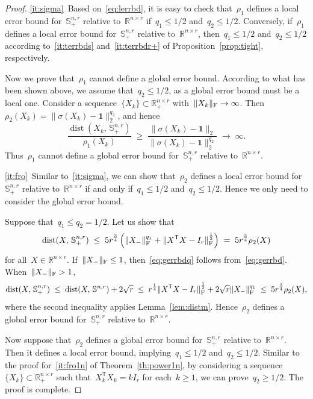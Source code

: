 \documentclass[11pt,a4paper]{article}  %
\theoremstyle{definition}
\DeclareMathOperator{\dist}{dist}
\newcommand{\RR}{\mathbb{R}}
\newcommand{\res}{\rho}
\newcommand{\col}{r}
\newcommand{\stf}[1]{\mathbb{S}^{#1}}
\newcommand{\fro}{{\scriptstyle{\textnormal{F}}}}
\newcommand{\trs}{{\scriptstyle{\mathsf{T}}}}
\newcommand{\ones}{\mathbf{1}}
\begin{document}
\begin{proof}
   \ref{it:sigma}~Based on~\eqref{eq:lerrbd}, it is easy to check that~$\res_1$ defines a local error bound
    for~$\stf{n,\col}_+$ relative to~$\RR^{n\times \col}$ if~$q_1 \le 1/2$ and~$q_2\le 1/2$.
    Conversely, if~$\res_1$ defines a local error bound for~$\stf{n,\col}_+$ relative
    to~$\RR^{n\times \col}$, then~$q_1 \le 1/2$ and~$q_2\le 1/2$ according to~\ref{it:terrbds}
    and~\ref{it:terrbdr+} of Proposition~\ref{prop:tight}, respectively.

    Now we prove that~$\res_1$ cannot define a global error bound.
    According to what has been shown above, we assume that~$q_2 \le 1/2$, as a global error bound must be a local one.
    Consider a sequence~$\{X_k\}\subset \RR^{n\times \col}_+$ with~$\|X_k\|_\fro \to \infty$.
    Then~$\res_2(X_k) = \|\sigma(X_k)-\ones\|_2^{q_2}$, and hence
    \begin{equation*}
        \frac{\dist(X_k,\, \stf{n,\col}_+)}{\res_1(X_k)}
        \;\ge\;\frac{\|\sigma(X_k) -\ones\|_2}{\|\sigma(X_k) -\ones\|_2^{q_2}}
        \;\to\; \infty.
    \end{equation*}
   Thus~$\res_1$ cannot define a global error bound for~$\stf{n,\col}_+$ relative to~$\RR^{n\times \col}$.



    \ref{it:fro}~Similar to~\ref{it:sigma}, we can show that~$\res_2$ defines a local error bound
    for~$\stf{n,\col}_+$ relative to~$\RR^{n\times \col}$ if and only if~$q_1 \le 1/2$ and~$q_2 \le 1/2$.
    Hence we only need to consider the global error bound.

    Suppose that~$q_1 \le q_2 = 1/2$. Let us show that
    \begin{equation}
        \label{eq:gerrbdq}
        \dist(X,\, \stf{n,\col}_+)
        \;\le\; 5\col^{\frac{3}{4}}\left( \|X_{-}\|_\fro^{q_1} + \|X^\trs X -I_\col\|_\fro^{\frac{1}{2}} \right)
        \;=\; 5\col^{\frac{3}{4}}\res_2(X)
    \end{equation}
    for all~$X\in\RR^{n\times \col}$.
    If~$\|X_{-}\|_\fro \le 1$, then~\eqref{eq:gerrbdq} follows from~\eqref{eq:gerrbd}. When~$\|X_{-}\|_\fro > 1$,
    \begin{equation}
        \nonumber
        \dist(X,\,\stf{n, \col}_+)
        \;\le\; \dist(X,\,\stf{n, \col}) + 2\sqrt{\col}
         \;\le\; \col^{\frac{1}{4}}\|X^\trs X -I_\col\|_\fro^{\frac{1}{2}} + 2\sqrt{\col} \|X_{-}\|_\fro^{q_1}
         \;\le\; 5\col^{\frac{3}{4}}\res_2(X),
    \end{equation}
    where the second inequality applies Lemma~\ref{lem:distm}.
    Hence~$\res_2$ defines a global error bound for~$\stf{n,\col}_+$ relative to~$\RR^{n\times \col}$.

    Now suppose that~$\res_2$ defines a global error bound for~$\stf{n,\col}_+$ relative
    to~$\RR^{n\times \col}$. Then it defines a local error bound, implying~$q_1 \le 1/2$
    and~$q_2 \le 1/2$.
    Similar to the proof for~\ref{it:fro1n} of Theorem~\ref{th:power1n}, by
    considering a sequence~$\{X_k\}\subset \RR^{n\times \col}_+$ such that~$X_k^\trs X_k = kI_\col$
    for each~$k\ge 1$, we can prove~$q_2 \ge 1/2$.
    The proof is complete.
\end{proof}
\end{document}
